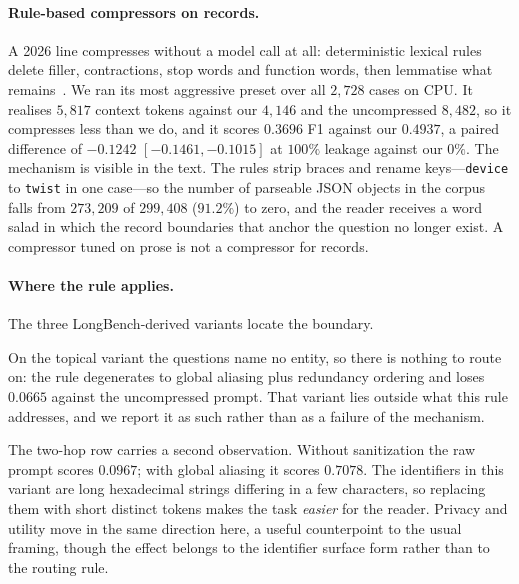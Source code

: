 \paragraph{Rule-based compressors on records.}
A 2026 line compresses without a model call at all: deterministic lexical rules delete filler, contractions, stop words and function words, then lemmatise what remains~\cite{chokshi-lexical-2026}. We ran its most aggressive preset over all $2{,}728$ cases on CPU. It realises $5{,}817$ context tokens against our $4{,}146$ and the uncompressed $8{,}482$, so it compresses less than we do, and it scores $0.3696$ F1 against our $0.4937$, a paired difference of $-0.1242$ $[-0.1461,-0.1015]$ at $100\%$ leakage against our $0\%$. The mechanism is visible in the text. The rules strip braces and rename keys---\texttt{device} to \texttt{twist} in one case---so the number of parseable JSON objects in the corpus falls from $273{,}209$ of $299{,}408$ ($91.2\%$) to zero, and the reader receives a word salad in which the record boundaries that anchor the question no longer exist. A compressor tuned on prose is not a compressor for records.

\paragraph{Where the rule applies.}
The three LongBench-derived variants locate the boundary.

\begin{center}\small
\setlength{\tabcolsep}{4pt}
\end{center}

On the topical variant the questions name no entity, so there is nothing to route on: the
rule degenerates to global aliasing plus redundancy ordering and loses $0.0665$ against the
uncompressed prompt. That variant lies outside what this rule addresses, and we report it as
such rather than as a failure of the mechanism.

The two-hop row carries a second observation. Without sanitization the raw prompt scores
$0.0967$; with global aliasing it scores $0.7078$. The identifiers in this variant are long
hexadecimal strings differing in a few characters, so replacing them with short distinct
tokens makes the task \emph{easier} for the reader. Privacy and utility move in the same
direction here, a useful counterpoint to the usual framing, though the effect belongs to the
identifier surface form rather than to the routing rule.

